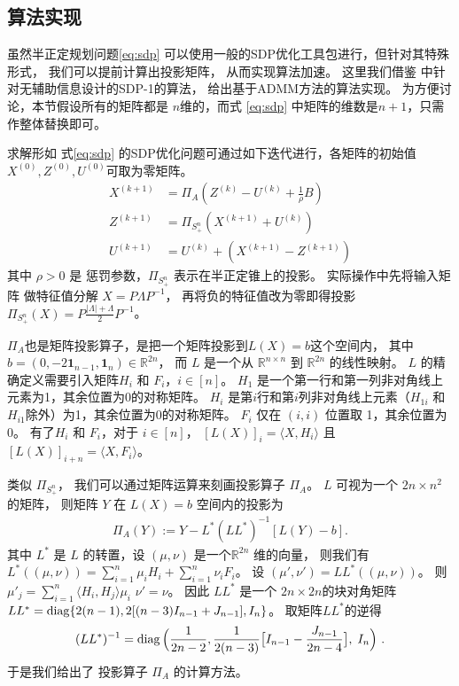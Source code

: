 \subsection{算法实现}\label{sec:sdp_admm}
虽然半正定规划问题\ref{eq:sdp} 可以使用一般的SDP优化工具包进行，但针对其特殊形式，
我们可以提前计算出投影矩阵，
从而实现算法加速。
这里我们借鉴 \citet{amini2018semidefinite} 中针对无辅助信息设计的SDP-1的算法，
给出基于ADMM方法的算法实现。
为方便讨论，本节假设所有的矩阵都是 $n$维的，而式 \eqref{eq:sdp} 中矩阵的维数是$n+1$，只需作整体替换即可。

求解形如 式\eqref{eq:sdp} 的SDP优化问题可通过如下迭代进行，各矩阵的初始值$X^{(0)},Z^{(0)},U^{(0)}$可取为零矩阵。
\begin{align}
    X^{(k+1)} &= \Pi_A(Z^{(k)} - U^{(k)} + \frac{1}{\rho}B)\label{eq:admm} \\
    Z^{(k+1)} &= \Pi_{S_+^n}(X^{(k+1)} + U^{(k)}) \\
    U^{(k+1)} &= U^{(k)} + (X^{(k+1)} - Z^{(k+1)}) 
    \end{align}
其中 $\rho>0$ 是 惩罚参数，$\Pi_{S_+^n}$ 表示在半正定锥上的投影。
实际操作中先将输入矩阵 做特征值分解 $X=P\Lambda P^{-1}$，
再将负的特征值改为零即得投影$\Pi_{S_+^n}(X)=P\frac{|\Lambda| + \Lambda}{2}P^{-1}$。

$\Pi_A$也是矩阵投影算子，是把一个矩阵投影到$L(X) = b$这个空间内，
其中 $b=(0, -2 \mathbf{1}_{n-1}, \mathbf{1}_{n}) \in \mathbb{R}^{2n}$，
而
$L$ 是一个从 $\mathbb{R}^{n \times n} $ 到 $\mathbb{R}^{2n}$ 的线性映射。
$L$ 的精确定义需要引入矩阵$H_i$ 和 $F_i$，$i\in [n]$。
$H_1$ 是一个第一行和第一列非对角线上元素为1，其余位置为0的对称矩阵。
$H_i$ 是第$i$行和第$i$列非对角线上元素（$H_{1i}$ 和 $H_{i1}$除外）为1，其余位置为0的对称矩阵。
$F_i$ 仅在 $(i,i)$ 位置取 1，其余位置为0。
有了$H_i$ 和 $F_i$，对于 $i \in [n]$，
$[L(X)]_i = \langle X,H_i \rangle$ 且 $[L(X)]_{i+n} = \langle X,F_i \rangle$。

类似 $\Pi_{S_+^n}$， 我们可以通过矩阵运算来刻画投影算子 $\Pi_{A}$。 
$L$ 可视为一个 $2n \times n^2$ 的矩阵，
则矩阵 $Y$ 在 $L(X)=b$ 空间内的投影为
\begin{align}\label{eq:proj:L:Y}
\Pi_{A}(Y) := Y - L^* (L L^*)^{-1}[ L(Y) - b] .
\end{align}
其中 $L^*$  是 $L$ 的转置，设 $(\mu,\nu)$ 是一个$\mathbb{R}^{2n}$ 维的向量，
则我们有 $L^*((\mu,\nu)) = \sum_{i=1}^n \mu_i H_i + \sum_{i=1}^n \nu_i F_i$。
设 $(\mu',\nu')=LL^*((\mu,\nu))$。
则$\mu'_j = \sum_{i=1}^n \langle H_i, H_j \rangle \mu_i$
$\nu'=\nu$。
因此 $L L^*$ 是一个 $2n\times 2n$的块对角矩阵 
$LL^*=\operatorname{diag}\{2(n-1), 2[(n-3)I_{n-1}+J_{n-1}],I_n\} $。
取矩阵$L L^*$的逆得
\begin{align*}
(LL^*)^{-1} = \operatorname{diag}\Big(\frac{1}{2n-2},\frac{1}{2(n-3)} 
\big[ I_{n-1} - \frac{J_{n-1}}{2n-4} \big],\; I_n \Big) \ . 
\end{align*}
于是我们给出了 投影算子 $\Pi_{A} $ 
的计算方法。

